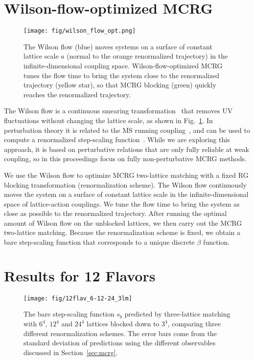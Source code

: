 \documentclass{PoS}
\newcommand{\be}{\ensuremath{\beta} }
\newcommand{\MSbar}{\ensuremath{\overline{\textrm{MS}} } }
\newcommand{\fig}[1]{Fig.~\ref{#1}}
\newcommand{\secref}[1]{Section~\ref{#1}}
\begin{document}
\section{\label{sec:wmcrg}Wilson-flow-optimized MCRG} %
\begin{figure}[th]
  \centering
  \texttt{[image: fig/wilson\_flow\_opt.png]}
  \caption{The Wilson flow (blue) moves systems on a surface of constant lattice scale $a$ (normal to the orange renormalized trajectory) in the infinite-dimensional coupling space.  Wilson-flow-optimized MCRG tunes the flow time to bring the system close to the renormalized trajectory (yellow star), so that MCRG blocking (green) quickly reaches the renormalized trajectory.}
  \label{fig:wflow_opt}
\end{figure}

The Wilson flow is a continuous smearing transformation~\cite{Narayanan:2006rf} that removes UV fluctuations without changing the lattice scale, as shown in \fig{fig:wflow_opt}.
In perturbation theory it is related to the \MSbar running coupling~\cite{Luscher:2010iy}, and can be used to compute a renormalized step-scaling function~\cite{Fodor:2012td, Fodor:2012qh}.
While we are exploring this approach, it is based on perturbative relations that are only fully reliable at weak coupling, so in this proceedings focus on fully non-perturbative MCRG methods.

We use the Wilson flow to optimize MCRG two-lattice matching with a fixed RG blocking transformation (renormalization scheme).
The Wilson flow continuously moves the system on a surface of constant lattice scale in the infinite-dimensional space of lattice-action couplings.
We tune the flow time to bring the system as close as possible to the renormalized trajectory.
After running the optimal amount of Wilson flow on the unblocked lattices, we then carry out the MCRG two-lattice matching.
Because the renormalization scheme is fixed, we obtain a bare step-scaling function that corresponds to a unique discrete \be function.



\section{\label{sec:results}Results for 12 Flavors} %
\begin{figure}[ht]
  \centering
  \texttt{[image: fig/12flav\_6-12-24\_3lm]}
  \caption{The bare step-scaling function $s_b$ predicted by three-lattice matching with $6^4$, $12^4$ and $24^4$ lattices blocked down to $3^4$, comparing three different renormalization schemes.  The error bars come from the standard deviation of predictions using the different observables discussed in \protect\secref{sec:mcrg}.}
  \label{fig:24to3}
\end{figure}
\end{document}
